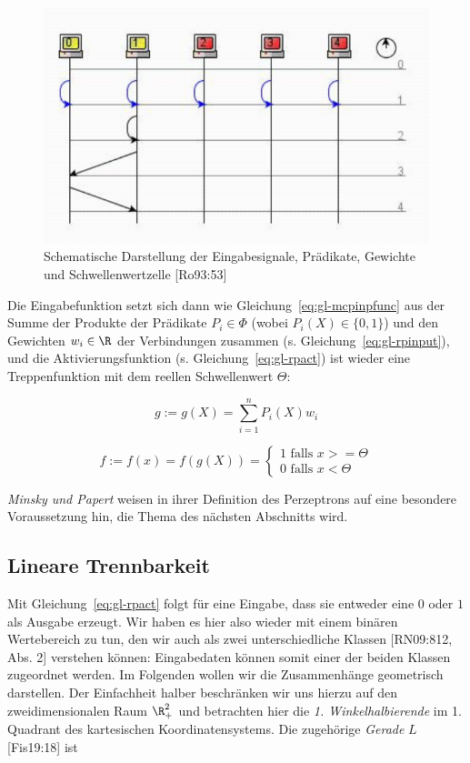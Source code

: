 \begin{figure}[h]
    \centering
    \includegraphics{images/p1ReadSeq.pdf}
    \caption{Schematische Darstellung der Eingabesignale, Prädikate, Gewichte und Schwellenwertzelle [Ro93:53]}
    \label{fig-perctheda}
\end{figure}


Die Eingabefunktion setzt sich dann wie Gleichung~\ref{eq:gl-mcpinpfunc} aus der Summe der Produkte der Prädikate $P_i \in \Phi$ (wobei $P_i(X) \in \{0, 1\}$) und den Gewichten $w_i \in \R$ der Verbindungen zusammen (s. Gleichung~\ref{eq:gl-rpinput}), und die Aktivierungsfunktion (s. Gleichung~\ref{eq:gl-rpact}) ist wieder eine Treppenfunktion mit dem reellen Schwellenwert $\Theta$:

\begin{equation}
g:= g(X) = \sum^n_{i=1} P_i(X) w_i
\label{eq:gl-rpinput}
\end{equation}

\begin{equation}
    f:= f(x) = f(g(X)) = \begin{cases}
                          1 \text{ falls } x >= \Theta \\
                          0 \text{ falls } x < \Theta
\end{cases}
\label{eq:gl-rpact}
\end{equation}

\noindent
\textit{Minsky und Papert} weisen in ihrer Definition des Perzeptrons auf eine besondere Voraussetzung hin, die Thema des nächsten Abschnitts wird.

\subsection{Lineare Trennbarkeit}
Mit Gleichung~\ref{eq:gl-rpact} folgt für eine Eingabe, dass sie entweder eine $0$ oder $1$ als Ausgabe erzeugt.
Wir haben es hier also wieder mit einem binären Wertebereich zu tun, den wir auch als zwei unterschiedliche Klassen [RN09:812, Abs. 2] verstehen können: Eingabedaten können somit einer der beiden Klassen zugeordnet werden.
Im Folgenden wollen wir die Zusammenhänge geometrisch darstellen.
Der Einfachheit halber beschränken wir uns hierzu auf den zweidimensionalen Raum $\R_+^2$ und betrachten hier die \textit{1. Winkelhalbierende} im 1. Quadrant des kartesischen Koordinatensystems.
Die zugehörige \textit{Gerade} $L$ [Fis19:18] ist

